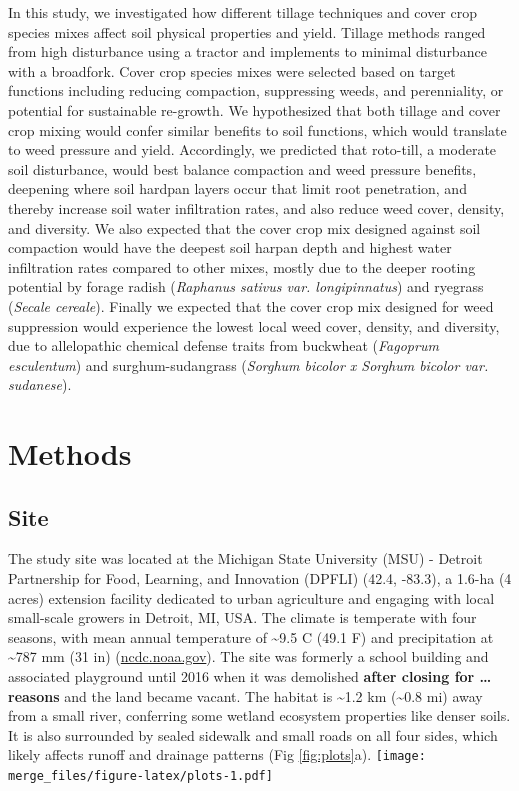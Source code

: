 \documentclass[
  12pt,
]{article}
\begin{document}
In this study, we investigated how different tillage techniques and cover crop species mixes affect soil physical properties and yield.
Tillage methods ranged from high disturbance using a tractor and implements to minimal disturbance with a broadfork.
Cover crop species mixes were selected based on target functions including reducing compaction, suppressing weeds, and perenniality, or potential for sustainable re-growth.
We hypothesized that both tillage and cover crop mixing would confer similar benefits to soil functions, which would translate to weed pressure and yield.
Accordingly, we predicted that roto-till, a moderate soil disturbance, would best balance compaction and weed pressure benefits, deepening where soil hardpan layers occur that limit root penetration, and thereby increase soil water infiltration rates, and also reduce weed cover, density, and diversity.
We also expected that the cover crop mix designed against soil compaction would have the deepest soil harpan depth and highest water infiltration rates compared to other mixes, mostly due to the deeper rooting potential by forage radish (\emph{Raphanus sativus var. longipinnatus}) and ryegrass (\emph{Secale cereale}).
Finally we expected that the cover crop mix designed for weed suppression would experience the lowest local weed cover, density, and diversity, due to allelopathic chemical defense traits from buckwheat (\emph{Fagoprum esculentum}) and surghum-sudangrass (\emph{Sorghum bicolor x Sorghum bicolor var. sudanese}).

\hypertarget{methods}{%
\section{Methods}\label{methods}}

\hypertarget{site}{%
\subsection{Site}\label{site}}

The study site was located at the Michigan State University (MSU) - Detroit Partnership for Food, Learning, and Innovation (DPFLI) (42.4, -83.3), a 1.6-ha (4 acres) extension facility dedicated to urban agriculture and engaging with local small-scale growers in Detroit, MI, USA.
The climate is temperate with four seasons, with mean annual temperature of \textasciitilde9.5 C (49.1 F) and precipitation at \textasciitilde787 mm (31 in) (\url{ncdc.noaa.gov}).
The site was formerly a school building and associated playground until 2016 when it was demolished \textbf{after closing for \ldots{} reasons} and the land became vacant.
The habitat is \textasciitilde1.2 km (\textasciitilde0.8 mi) away from a small river, conferring some wetland ecosystem properties like denser soils.
It is also surrounded by sealed sidewalk and small roads on all four sides, which likely affects runoff and drainage patterns (Fig \ref{fig:plots}a).
\texttt{[image: merge\_files/figure-latex/plots-1.pdf]}
\end{document}
